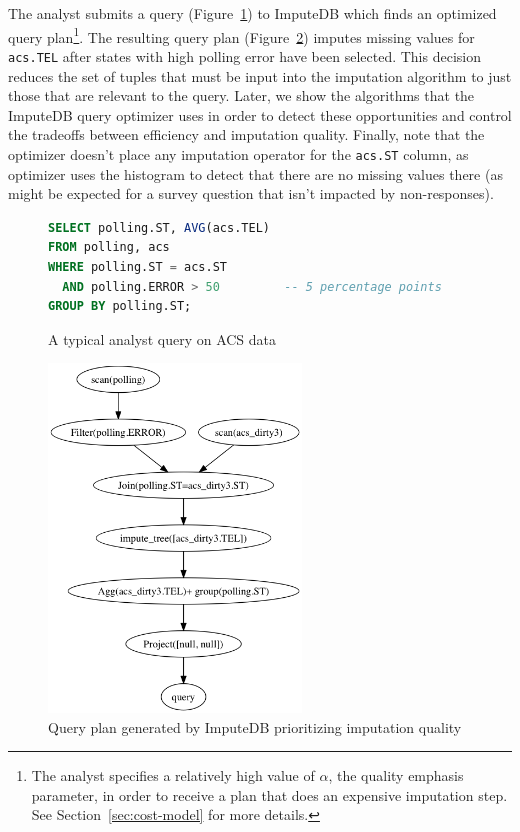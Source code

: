 The analyst submits a query (Figure~\ref{fig:example-query}) to ImputeDB which finds an optimized query
plan\footnote{The analyst specifies a relatively high value of $\alpha$, the quality
emphasis parameter, in order to receive a plan that does an expensive imputation step. See
Section~\ref{sec:cost-model} for more details.}. The resulting query plan
(Figure~\ref{fig:query-plan})
imputes missing values for \verb!acs.TEL! after states with high polling error have been
selected. This decision reduces the set of tuples that must be input into the imputation
algorithm to just those that are relevant to the query. Later, we show the algorithms that
the ImputeDB query optimizer uses in order to detect these opportunities and control the
tradeoffs between efficiency and imputation quality. Finally, note that the optimizer doesn't
place any imputation operator for the \verb|acs.ST| column, as optimizer uses the histogram to
detect that there are no missing values there (as might be expected for a survey question that isn't
impacted by non-responses).

\begin{figure}
\begin{lstlisting}[language=SQL]
SELECT polling.ST, AVG(acs.TEL)
FROM polling, acs
WHERE polling.ST = acs.ST
  AND polling.ERROR > 50         -- 5 percentage points
GROUP BY polling.ST;
\end{lstlisting}
\caption{A typical analyst query on ACS data}
\label{fig:example-query}
\end{figure}

\begin{figure}[!ht]
    \centering
    \includegraphics[width=0.6\textwidth]{figures/example.png}
    \caption{Query plan generated by ImputeDB prioritizing imputation quality}
    \label{fig:query-plan}
\end{figure}
        
